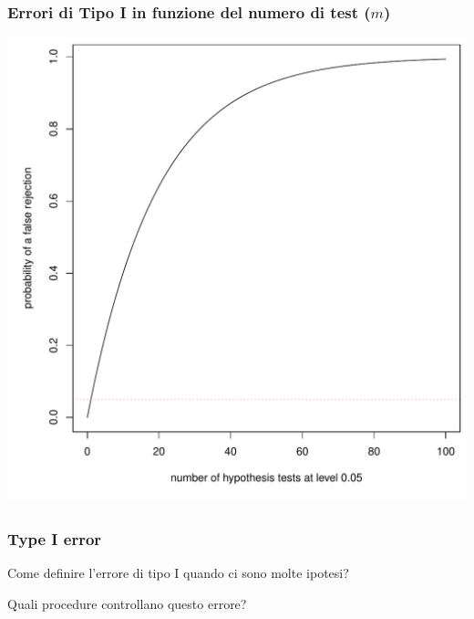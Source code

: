 \documentclass[xcolor={pdftex,dvipsnames,table}]{beamer}
\newcommand{\bb}[1]{\begin{block}{#1}}
\newcommand{\eb}{\end{block}}
\begin{document}
\subsection{}
\begin{frame}
\frametitle{Errori di Tipo I in funzione del numero di test ($m$)}

\includegraphics[scale=.3]{plaatjes/typeI}
\end{frame}


\subsection{}
\begin{frame}
\frametitle{Type I error}
\bb{Come definire l'errore di tipo I quando ci sono molte ipotesi?}
\eb
\bb{Quali procedure controllano questo errore?}
\eb
\end{frame}
\end{document}
